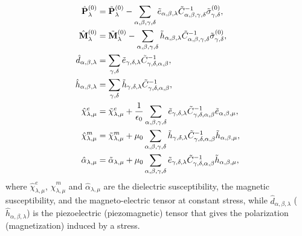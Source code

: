 \documentclass[12pt,a4paper,twoside]{report}
\begin{document}
\begin{align}
\hat {\bf P}^{(0)}_{\lambda}&= \tilde {\bf P}^{(0)}_{\lambda}
-\sum_{\alpha,\beta,\gamma,\delta} \tilde e_{\alpha,\beta,\lambda}
\tilde C^{-1}_{\alpha,\beta,\gamma,\delta} 
\tilde \sigma^{(0)}_{\gamma,\delta}, \\
\hat {\bf M}^{(0)}_{\lambda}&= \tilde {\bf M}^{(0)}_{\lambda}
-\sum_{\alpha,\beta,\gamma,\delta} \tilde h_{\alpha,\beta,\lambda}
\tilde C^{-1}_{\alpha,\beta,\gamma,\delta} 
\tilde \sigma^{(0)}_{\gamma,\delta}, \\
\hat d_{\alpha,\beta,\lambda}&= \sum_{\gamma,\delta} 
\tilde e_{\gamma,\delta,\lambda} 
\tilde C^{-1}_{\gamma,\delta,\alpha,\beta}, \\
\hat h_{\alpha,\beta,\lambda}&= \sum_{\gamma,\delta} 
\tilde h_{\gamma,\delta,\lambda} 
\tilde C^{-1}_{\gamma,\delta,\alpha,\beta}, \\
\hat \chi^e_{\lambda,\mu}&= \tilde \chi^e_{\lambda,\mu}
+{1\over \epsilon_0} 
\sum_{\alpha,\beta,\gamma,\delta}\tilde e_{\gamma,\delta,\lambda}
\tilde C^{-1}_{\gamma,\delta,\alpha,\beta} \tilde e_{\alpha,\beta,\mu}, \\
\hat \chi^m_{\lambda,\mu}&= \tilde \chi^m_{\lambda,\mu}
+{\mu_0}\sum_{\alpha,\beta,\gamma,\delta}\tilde h_{\gamma,\delta,\lambda}
\tilde C^{-1}_{\gamma,\delta,\alpha,\beta} \tilde h_{\alpha,\beta,\mu}, \\
\hat \alpha_{\lambda,\mu}&= \tilde \alpha_{\lambda,\mu}
+\mu_0 \sum_{\alpha,\beta,\gamma,\delta}\tilde e_{\gamma,\delta,\lambda}
\tilde C^{-1}_{\gamma,\delta,\alpha,\beta} \tilde h_{\alpha,\beta,\mu},
\end{align}
where $\hat \chi^e_{\lambda,\mu}$, $\hat \chi^m_{\lambda,\mu}$ and
$\hat \alpha_{\lambda,\mu}$ are the dielectric susceptibility, the magnetic
susceptibility, 
and the magneto-electric tensor at constant stress, while 
$\hat d_{\alpha,\beta,\lambda}$ ($\hat h_{\alpha,\beta,\lambda}$)
is the piezoelectric (piezomagnetic) tensor that
gives the polarization (magnetization) induced by a stress. 
\end{document}

